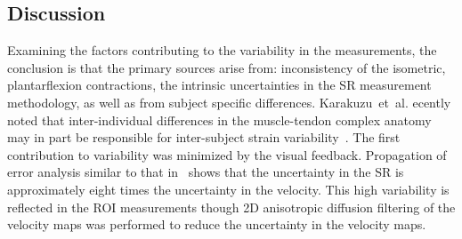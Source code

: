 %
%
%
%

\subsection{Discussion}
Examining the factors contributing to the variability in the measurements, the conclusion is that the primary sources arise from: inconsistency of the isometric, plantarflexion contractions, the intrinsic uncertainties in the SR measurement methodology, as well as from subject specific differences. 
Karakuzu~et~al. ecently noted that inter-individual differences in the muscle-tendon complex anatomy may in part be responsible for inter-subject strain variability~\cite{RNSS4}.
The first contribution to variability was minimized by the visual feedback.
Propagation of error analysis similar to that in~\cite{RNSS14} shows that the uncertainty in the SR is approximately eight times the uncertainty in the velocity.
This high variability is reflected in the ROI measurements though 2D anisotropic diffusion filtering of the velocity maps was performed to reduce the uncertainty in the velocity maps.

